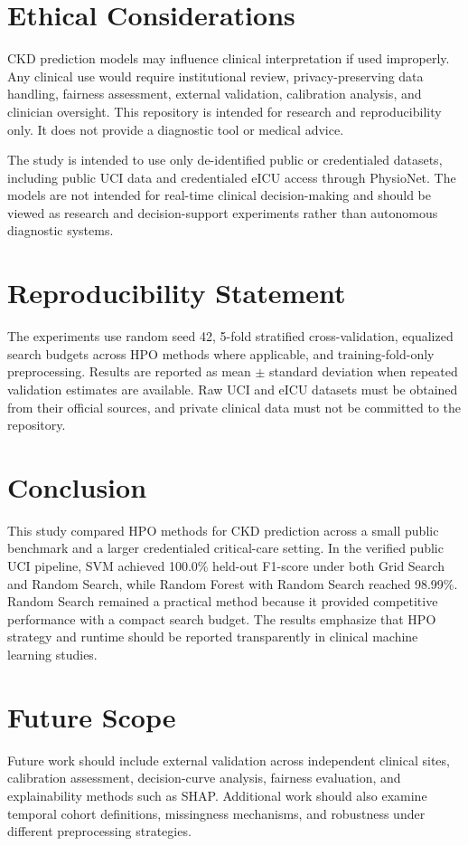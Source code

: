 \documentclass[runningheads]{llncs}
\begin{document}
\section{Ethical Considerations}

CKD prediction models may influence clinical interpretation if used improperly. Any clinical use would require institutional review, privacy-preserving data handling, fairness assessment, external validation, calibration analysis, and clinician oversight. This repository is intended for research and reproducibility only. It does not provide a diagnostic tool or medical advice.

The study is intended to use only de-identified public or credentialed datasets, including public UCI data and credentialed eICU access through PhysioNet. The models are not intended for real-time clinical decision-making and should be viewed as research and decision-support experiments rather than autonomous diagnostic systems.

\section{Reproducibility Statement}

The experiments use random seed 42, 5-fold stratified cross-validation, equalized search budgets across HPO methods where applicable, and training-fold-only preprocessing. Results are reported as mean $\pm$ standard deviation when repeated validation estimates are available. Raw UCI and eICU datasets must be obtained from their official sources, and private clinical data must not be committed to the repository.

\section{Conclusion}

This study compared HPO methods for CKD prediction across a small public benchmark and a larger credentialed critical-care setting. In the verified public UCI pipeline, SVM achieved 100.0\% held-out F1-score under both Grid Search and Random Search, while Random Forest with Random Search reached 98.99\%. Random Search remained a practical method because it provided competitive performance with a compact search budget. The results emphasize that HPO strategy and runtime should be reported transparently in clinical machine learning studies.

\section{Future Scope}

Future work should include external validation across independent clinical sites, calibration assessment, decision-curve analysis, fairness evaluation, and explainability methods such as SHAP. Additional work should also examine temporal cohort definitions, missingness mechanisms, and robustness under different preprocessing strategies.

\nocite{*}


\end{document}
